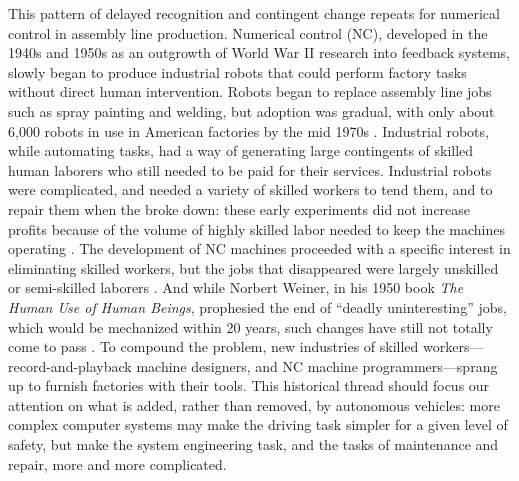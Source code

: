 This pattern of delayed recognition and contingent change repeats for
numerical control in assembly line production. Numerical control (NC),
developed in the 1940s and 1950s as an outgrowth of World War II
research into feedback systems, slowly began to produce industrial
robots that could perform factory tasks without direct human
intervention. Robots began to replace assembly line jobs such
as spray painting and welding, but adoption was gradual, with only
about 6,000 robots in use in American factories by the mid
1970s \cite[p. 159]{nyeAmericas}. Industrial robots, while automating tasks,
had a way of generating large contingents of skilled human laborers
who still needed to be paid for their services. Industrial robots were
complicated, and needed a variety of skilled workers to tend them, and
to repair them when the broke down: these early experiments did not
increase profits because of the volume of highly skilled labor needed
to keep the machines operating \cite[p. 162]{nyeAmericas}. The development of NC machines
proceeded with a specific interest in eliminating skilled workers, but
the jobs that disappeared were largely unskilled or semi-skilled
laborers \cite[p. 164]{nyeAmericas}. And while Norbert Weiner, in his 1950 book \emph{The Human Use of
Human Beings}, prophesied the end of ``deadly uninteresting'' jobs, which
would be mechanized within 20 years, such changes have still not
totally come to pass \cite[p. 161]{nyeAmericas}. To compound the problem, new industries of
skilled workers---record-and-playback machine designers, and NC machine
programmers---sprang up to furnish factories with their tools. This
historical thread should focus our attention on what is added, rather
than removed, by
autonomous vehicles: more complex computer systems may make the driving
task simpler for a given level of safety, but make the system
engineering task, and the tasks of maintenance and repair, more and more complicated.

